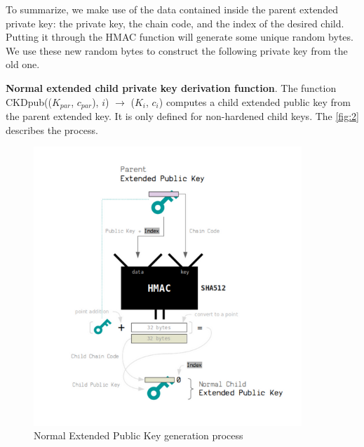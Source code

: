 To summarize, we make use of the data contained inside the parent extended private key: the private key, the chain code, and the index of the desired child. Putting it through the HMAC function will generate some unique random bytes. We use these new random bytes to construct the following private key from the old one.

\bigskip
{\textbf{Normal extended child private key derivation function}}. \label{norm2}The function CKDpub(($K_{par}$, $c_{par}$), $i$) $\rightarrow$ ($K_i$, $c_i$) computes a child extended public key from the parent extended key. It is only defined for non-hardened child keys.
The \autoref{fig:2} describes the process.

\begin{figure}[ht!]
    \centering
    \includegraphics[width=0.9\textwidth]{images/normal_pub_gen.png}
    \caption[Normal Extended Public Key generation process]{Normal Extended Public Key generation process \cite{learnme}}
    \label{fig:2}
\end{figure}

